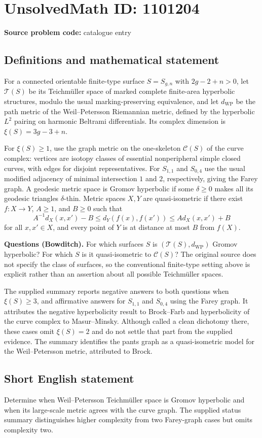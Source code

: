 \documentclass[11pt]{article}
\begin{document}
\section*{UnsolvedMath ID: 1101204}
\textbf{Source problem code:} catalogue entry
\subsection{Definitions and mathematical statement}
For a connected orientable finite-type surface $S=S_{g,n}$ with $2g-2+n>0$, let $\mathcal T(S)$ be its Teichm\"uller space of marked complete finite-area hyperbolic structures, modulo the usual marking-preserving equivalence, and let $d_{\mathrm{WP}}$ be the path metric of the Weil--Petersson Riemannian metric, defined by the hyperbolic $L^2$ pairing on harmonic Beltrami differentials. Its complex dimension is $\xi(S)=3g-3+n$.

For $\xi(S)\geq1$, use the graph metric on the one-skeleton $\mathcal C(S)$ of the curve complex: vertices are isotopy classes of essential nonperipheral simple closed curves, with edges for disjoint representatives. For $S_{1,1}$ and $S_{0,4}$ use the usual modified adjacency of minimal intersection $1$ and $2$, respectively, giving the Farey graph. A geodesic metric space is Gromov hyperbolic if some $\delta\geq0$ makes all its geodesic triangles $\delta$-thin. Metric spaces $X,Y$ are quasi-isometric if there exist $f:X\to Y$, $A\geq1$, and $B\geq0$ such that
\[
A^{-1}d_X(x,x')-B\leq d_Y(f(x),f(x'))\leq A d_X(x,x')+B
\]
for all $x,x'\in X$, and every point of $Y$ is at distance at most $B$ from $f(X)$.

\textbf{Questions (Bowditch).} For which surfaces $S$ is $(\mathcal T(S),d_{\mathrm{WP}})$ Gromov hyperbolic? For which $S$ is it quasi-isometric to $\mathcal C(S)$? The original source does not specify the class of surfaces, so the conventional finite-type setting above is explicit rather than an assertion about all possible Teichm\"uller spaces.

The supplied summary reports negative answers to both questions when $\xi(S)\geq3$, and affirmative answers for $S_{1,1}$ and $S_{0,4}$ using the Farey graph. It attributes the negative hyperbolicity result to Brock--Farb and hyperbolicity of the curve complex to Masur--Minsky. Although called a clean dichotomy there, these cases omit $\xi(S)=2$ and do not settle that part from the supplied evidence. The summary identifies the pants graph as a quasi-isometric model for the Weil--Petersson metric, attributed to Brock.
\subsection{Short English statement}
Determine when Weil--Petersson Teichm\"uller space is Gromov hyperbolic and when its large-scale metric agrees with the curve graph. The supplied status summary distinguishes higher complexity from two Farey-graph cases but omits complexity two.
\end{document}
